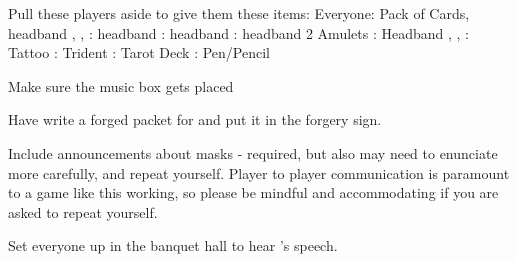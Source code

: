 \documentclass[green]{NeptuneBall}
\begin{document}
\name{\gChecklist{}}

Pull these players aside to give them these items:
Everyone: Pack of Cards,  headband
\cAriel{}, \cWillow{}, \cGeneral{}:  headband
\cPrince{}:  headband
\cWitch{}:  headband
			2	Amulets
\cQueen{}:  Headband
\cQueen{}, \cDiplomat{}, \cSpy{}: Tattoo
\cKing{}: Trident
\cSlave{}: Tarot Deck
\cGeneral{}: Pen/Pencil

Make sure the music box gets placed	

Have \cPlant{} write a forged packet for \cPriest{} and put it in the forgery sign.

Include announcements about masks - required, but also may need to enunciate more carefully, and repeat yourself. Player to player communication is paramount to a game like this working, so please be mindful and accommodating if you are asked to repeat yourself.

Set everyone up in the banquet hall to hear \cManta{}'s speech.
\end{document}
